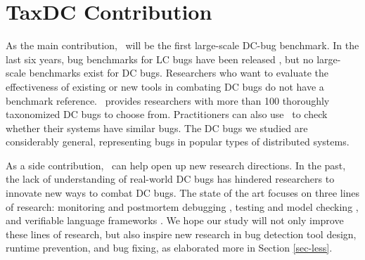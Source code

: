 
\section{TaxDC Contribution}

As the main contribution, \tdc\ will be the first large-scale DC-bug benchmark.
In the last six years, bug benchmarks for LC bugs have been released
\cite{Jalbert11-RADBench, jieyu}, but no large-scale benchmarks exist for DC
bugs.  Researchers who want to evaluate the effectiveness of existing or new
tools in combating DC bugs do not have a benchmark reference.  \tdc\ provides
researchers with more than 100 thoroughly taxonomized DC bugs to choose from.
Practitioners can also use \tdc\ to check whether their systems have similar
bugs.  The DC bugs we studied are considerably general, representing bugs in
popular types of distributed systems.

As a side contribution, \tdc\ can help open up new research directions.  In the
past, the lack of understanding of real-world DC bugs has hindered researchers
to innovate new ways to combat DC bugs.  The state of the art focuses on three
lines of research: monitoring and postmortem debugging \cite{Geels+07-Friday,
Liu+08-D3S, Liu+07-WiDS, Reynolds+06-Pip}, testing and model checking
\cite{Guo+11-Demeter, Killian+07-LifeDeathMaceMC, Leesatapornwongsa+14-Samc,
Simsa+10-Dbug, Yang+09-Modist}, and verifiable language frameworks
\cite{Desai+13-PLang, Wilcox+15-Verdi}.  We hope our study will not only improve
these lines of research, but also inspire new research in bug detection tool
design, runtime prevention, and bug fixing, as elaborated more in Section
\ref{sec-less}.

